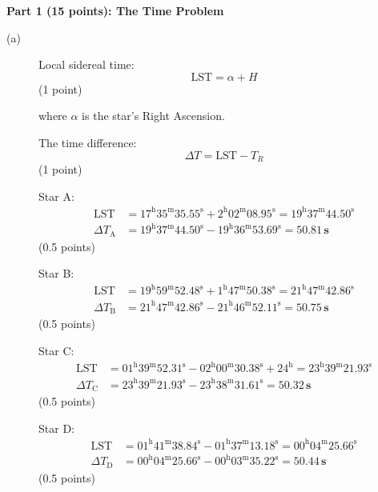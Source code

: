 \medskip\noindent\textbf{Part 1 (15 points): The Time Problem}

\begin{description}
\item[(a)] Local sidereal time:
  \[ \mathrm{LST} = \alpha + H \]
  \hfill(1 point)

  where $\alpha$ is the star's Right Ascension.

  The time difference:
  \[ \Delta T = \mathrm{LST} - T_R \]
  \hfill(1 point)

  Star A:
  \begin{align*}
    \mathrm{LST} &= 17^{\mathrm{h}}35^{\mathrm{m}}35.55^{\mathrm{s}}
      + 2^{\mathrm{h}}02^{\mathrm{m}}08.95^{\mathrm{s}}
      = 19^{\mathrm{h}}37^{\mathrm{m}}44.50^{\mathrm{s}} \\
    \Delta T_{\mathrm{A}} &= 19^{\mathrm{h}}37^{\mathrm{m}}44.50^{\mathrm{s}}
      - 19^{\mathrm{h}}36^{\mathrm{m}}53.69^{\mathrm{s}}
      = \mathbf{50.81\,s}
  \end{align*}
  \hfill(0.5 points)

  Star B:
  \begin{align*}
    \mathrm{LST} &= 19^{\mathrm{h}}59^{\mathrm{m}}52.48^{\mathrm{s}}
      + 1^{\mathrm{h}}47^{\mathrm{m}}50.38^{\mathrm{s}}
      = 21^{\mathrm{h}}47^{\mathrm{m}}42.86^{\mathrm{s}} \\
    \Delta T_{\mathrm{B}} &= 21^{\mathrm{h}}47^{\mathrm{m}}42.86^{\mathrm{s}}
      - 21^{\mathrm{h}}46^{\mathrm{m}}52.11^{\mathrm{s}}
      = \mathbf{50.75\,s}
  \end{align*}
  \hfill(0.5 points)

  Star C:
  \begin{align*}
    \mathrm{LST} &= 01^{\mathrm{h}}39^{\mathrm{m}}52.31^{\mathrm{s}}
      - 02^{\mathrm{h}}00^{\mathrm{m}}30.38^{\mathrm{s}} + 24^{\mathrm{h}}
      = 23^{\mathrm{h}}39^{\mathrm{m}}21.93^{\mathrm{s}} \\
    \Delta T_{\mathrm{C}} &= 23^{\mathrm{h}}39^{\mathrm{m}}21.93^{\mathrm{s}}
      - 23^{\mathrm{h}}38^{\mathrm{m}}31.61^{\mathrm{s}}
      = \mathbf{50.32\,s}
  \end{align*}
  \hfill(0.5 points)

  Star D:
  \begin{align*}
    \mathrm{LST} &= 01^{\mathrm{h}}41^{\mathrm{m}}38.84^{\mathrm{s}}
      - 01^{\mathrm{h}}37^{\mathrm{m}}13.18^{\mathrm{s}}
      = 00^{\mathrm{h}}04^{\mathrm{m}}25.66^{\mathrm{s}} \\
    \Delta T_{\mathrm{D}} &= 00^{\mathrm{h}}04^{\mathrm{m}}25.66^{\mathrm{s}}
      - 00^{\mathrm{h}}03^{\mathrm{m}}35.22^{\mathrm{s}}
      = \mathbf{50.44\,s}
  \end{align*}
  \hfill(0.5 points)


\end{description}
